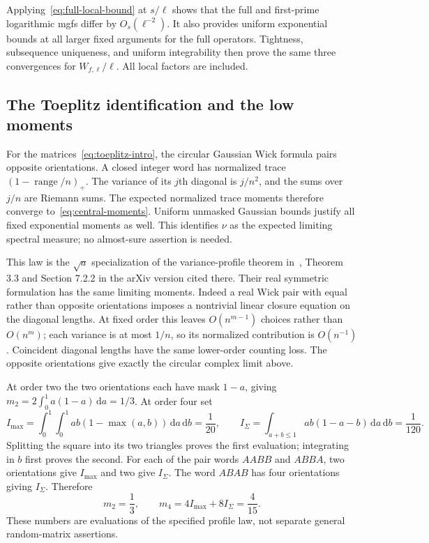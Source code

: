 \documentclass[11pt,reqno]{amsart}
\numberwithin{equation}{section}
\newcommand{\dd}{\,\mathrm d}
\begin{document}
Applying~\eqref{eq:full-local-bound} at $s/\ell$ shows that the
full and first-prime logarithmic mgfs differ by $O_s(\ell^{-2})$.
It also provides uniform exponential bounds at all larger fixed
arguments for the full operators. Tightness, subsequence
uniqueness, and uniform integrability then prove the same three
convergences for $W_{f,\ell}/\ell$. All local factors are included.

\subsection*{The Toeplitz identification and the low moments}

For the matrices~\eqref{eq:toeplitz-intro}, the circular Gaussian
Wick formula pairs opposite orientations. A closed integer word
has normalized trace $(1-\operatorname{range}/n)_+$.
The variance of its $j$th diagonal is $j/n^2$, and the sums over
$j/n$ are Riemann sums. The expected normalized trace moments
therefore converge to~\eqref{eq:central-moments}. Uniform
unmasked Gaussian bounds justify all fixed exponential moments
as well. This identifies $\nu$ as the expected limiting spectral
measure; no almost-sure assertion is needed.

This law is the $\sqrt a$ specialization of the variance-profile
theorem in~\cite{BSS}, Theorem 3.3 and Section 7.2.2 in the
arXiv version cited there.
Their real symmetric formulation has the same limiting moments.
Indeed a real Wick pair with equal rather than opposite
orientations imposes a nontrivial linear closure equation on
the diagonal lengths. At fixed order this leaves $O(n^{m-1})$
choices rather than $O(n^m)$; each variance is at most $1/n$,
so its normalized contribution is $O(n^{-1})$.
Coincident diagonal lengths have the same lower-order counting
loss. The opposite orientations give exactly the circular
complex limit above.

At order two the two orientations each have mask $1-a$, giving
$m_2=2\int_0^1a(1-a)\dd a=1/3$. At order four set
\[
 I_{\max}=\int_0^1\int_0^1ab(1-\max(a,b))\dd a\dd b=\frac1{20},
 \qquad
 I_{\Sigma}=\int_{a+b\le1}ab(1-a-b)\dd a\dd b=\frac1{120}.
\]
Splitting the square into its two triangles proves the first
evaluation; integrating in $b$ first proves the second.
For each of the pair words $AABB$ and $ABBA$, two orientations
give $I_{\max}$ and two give $I_{\Sigma}$. The word $ABAB$
has four orientations giving $I_{\Sigma}$. Therefore
\begin{equation}\label{eq:moments-low}
 m_2=\frac13,\qquad m_4=4I_{\max}+8I_{\Sigma}=\frac4{15}.
\end{equation}
These numbers are evaluations of the specified profile law,
not separate general random-matrix assertions.
\end{document}
